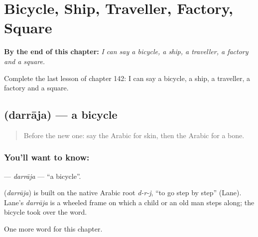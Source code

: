 
\chapter{Bicycle, Ship, Traveller, Factory, Square}
\label{ch:ar-bicycle-ship-traveller-factory-square}

\begin{chapteropening}
\textbf{By the end of this chapter:} \emph{I can say a bicycle, a ship, a traveller, a factory and a square.}

Complete the last lesson of chapter 142: I can say a bicycle, a ship, a traveller, a factory and a square.
\end{chapteropening}

\section[\texorpdfstring{\ar{دراجة} (darrāja)}{دراجة (darrāja)}]{ (darrāja) — a bicycle}

\label{lesson:AR-C142-darraja}



\begin{quote}
Before the new one: say the Arabic for skin, then the Arabic for a bone.
\end{quote}

\subsection*{You'll want to know: }
\textbf{} — \emph{darrāja} — \textquotedblleft{}a bicycle\textquotedblright{}.

\begin{cousinweb}
\textbf{} (\emph{darrāja}) is built on the native Arabic root \emph{d-r-j}, \textquotedblleft{}to go step by step\textquotedblright{} (Lane). Lane's \emph{darrāja} is a wheeled frame on which a child or an old man steps along; the bicycle took over the word.
\end{cousinweb}

\begin{grammarlens}[title={What you've built}]
One more word for this chapter.
\end{grammarlens}


